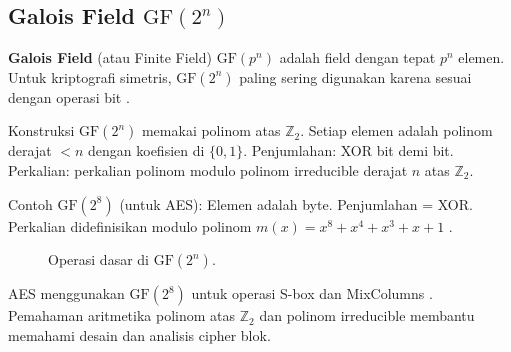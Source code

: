 \subsection{Galois Field \texorpdfstring{$\mathrm{GF}(2^n)$}{GF(2n)}}

\textbf{Galois Field} (atau Finite Field) $\mathrm{GF}(p^n)$ adalah field dengan tepat $p^n$ elemen. Untuk kriptografi simetris, $\mathrm{GF}(2^n)$ paling sering digunakan karena sesuai dengan operasi bit \cite{trappe2006}.

Konstruksi $\mathrm{GF}(2^n)$ memakai polinom atas $\mathbb{Z}_2$. Setiap elemen adalah polinom derajat $< n$ dengan koefisien di $\{0,1\}$. Penjumlahan: XOR bit demi bit. Perkalian: perkalian polinom modulo polinom irreducible derajat $n$ atas $\mathbb{Z}_2$.

Contoh $\mathrm{GF}(2^8)$ (untuk AES): Elemen adalah byte. Penjumlahan = XOR. Perkalian didefinisikan modulo polinom $m(x) = x^8 + x^4 + x^3 + x + 1$ \cite{fips197}.

\begin{figure}[htbp]
  \centering
  \caption{Operasi dasar di $\mathrm{GF}(2^n)$.}
\end{figure}

AES menggunakan $\mathrm{GF}(2^8)$ untuk operasi S-box dan MixColumns \cite{fips197}. Pemahaman aritmetika polinom atas $\mathbb{Z}_2$ dan polinom irreducible membantu memahami desain dan analisis cipher blok.
